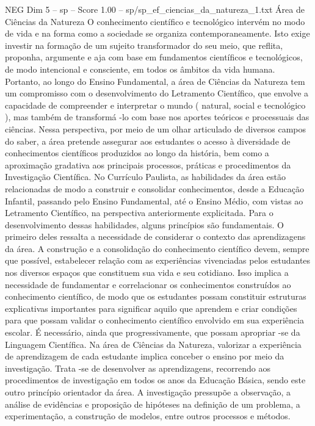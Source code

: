 \begin{textsample}{NEG Dim 5 – sp – Score 1.00 – sp/sp\_ef\_ciencias\_da\_natureza\_1.txt}  \label{ex:f5_neg_215}
Área de Ciências da Natureza O conhecimento científico e tecnológico intervém no modo de vida e na forma como a sociedade se organiza contemporaneamente.
Isto exige investir na formação de um sujeito transformador do seu meio, que reflita, proponha, argumente e aja com base em fundamentos científicos e tecnológicos, de modo intencional e consciente, em todos os âmbitos da vida humana.
Portanto, ao longo do Ensino Fundamental, a área de Ciências da Natureza tem um compromisso com o desenvolvimento do Letramento Científico, que envolve a capacidade de compreender e interpretar o mundo ( natural, social e tecnológico ), mas também de transformá -lo com base nos aportes teóricos e processuais das ciências.
Nessa perspectiva, por meio de um olhar articulado de diversos campos do saber, a área pretende assegurar aos estudantes o acesso à diversidade de conhecimentos científicos produzidos ao longo da história, bem como a aproximação gradativa aos principais processos, práticas e procedimentos da Investigação Científica.
No Currículo Paulista, as habilidades da área estão relacionadas de modo a construir e consolidar conhecimentos, desde a Educação Infantil, passando pelo Ensino Fundamental, até o Ensino Médio, com vistas ao Letramento Científico, na perspectiva anteriormente explicitada.
Para o desenvolvimento dessas habilidades, alguns princípios são fundamentais.
O primeiro deles ressalta a necessidade de considerar o contexto das aprendizagens da área.
A construção e a consolidação do conhecimento científico devem, sempre que possível, estabelecer relação com as experiências vivenciadas pelos estudantes nos diversos espaços que constituem sua vida e seu cotidiano.
Isso implica a necessidade de fundamentar e correlacionar os conhecimentos construídos ao conhecimento científico, de modo que os estudantes possam constituir estruturas explicativas importantes para significar aquilo que aprendem e criar condições para que possam validar o conhecimento científico envolvido em sua experiência escolar.
É necessário, ainda que progressivamente, que possam apropriar -se da Linguagem Científica.
Na área de Ciências da Natureza, valorizar a experiência de aprendizagem de cada estudante implica conceber o ensino por meio da investigação.
Trata -se de desenvolver as aprendizagens, recorrendo aos procedimentos de investigação em todos os anos da Educação Básica, sendo este outro princípio orientador da área.
A investigação pressupõe a observação, a análise de evidências e proposição de hipóteses na definição de um problema, a experimentação, a construção de modelos, entre outros processos e métodos.

\end{textsample}
